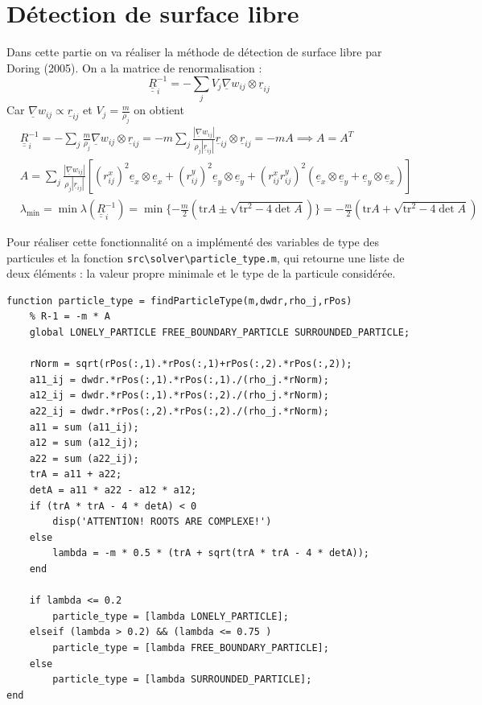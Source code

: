 \documentclass{article}
\newcommand\ul[1]{\underline{#1}}
\newcommand\uul[1]{\underline{\underline{#1}}}
\newcommand\uex{\ul{e}_x}
\newcommand\uey{\ul{e}_y}
\begin{document}
\section{Détection de surface libre}

Dans cette partie on va réaliser la méthode de détection de surface libre par Doring (2005). On a la matrice de renormalisation :
\begin{equation*}
	\uul{R}_i^{-1} = - \sum_{j} V_j \ul{\nabla} w_{ij} \otimes \ul{r}_{ij}
\end{equation*}
Car $\ul{\nabla}w_{ij} \propto \ul{r}_{ij}$ et $V_j = \frac{m}{\rho_j}$ on obtient
\begin{align*}
	& \uul{R}_i^{-1} = - \sum_{j} \frac{m}{\rho_j} \ul{\nabla} w_{ij} \otimes \ul{r}_{ij} = - m \sum_{j} 
	\frac{| \ul{\nabla} w_{ij} |}{\rho_j |\ul{r}_{ij} |} \ul{r}_{ij} \otimes \ul{r}_{ij} = -m A \implies A = A^T \\
	& A = \sum_j \frac{| \ul{\nabla} w_{ij} |}{\rho_j |\ul{r}_{ij} |} \left[ (r_{ij}^x)^2 \uex \otimes \uex + (r_{ij}^y)^2 \uey \otimes \uey + (r_{ij}^x r_{ij}^y)^2 (\uex \otimes \uey + \uey \otimes \uex) \right] \\ 
	& \lambda_{\min} = \min\lambda(\uul{R}_i^{-1}) = \min\{ -\frac{m}{2} (\mathrm{tr} A \pm \sqrt{\mathrm{tr}^2 - 4 \det A}) \} = -\frac{m}{2} (\mathrm{tr} A + \sqrt{\mathrm{tr}^2 - 4 \det A})
\end{align*}

Pour réaliser cette fonctionnalité on a implémenté des variables de type des particules et la fonction \lstinline$src\solver\particle_type.m$, qui retourne une liste de deux éléments : la valeur propre minimale et le type de la particule considérée.
\begin{lstlisting}           
function particle_type = findParticleType(m,dwdr,rho_j,rPos)
    % R-1 = -m * A 
    global LONELY_PARTICLE FREE_BOUNDARY_PARTICLE SURROUNDED_PARTICLE;

    rNorm = sqrt(rPos(:,1).*rPos(:,1)+rPos(:,2).*rPos(:,2)); 
    a11_ij = dwdr.*rPos(:,1).*rPos(:,1)./(rho_j.*rNorm); 
    a12_ij = dwdr.*rPos(:,1).*rPos(:,2)./(rho_j.*rNorm); 
    a22_ij = dwdr.*rPos(:,2).*rPos(:,2)./(rho_j.*rNorm); 
    a11 = sum (a11_ij);
    a12 = sum (a12_ij);
    a22 = sum (a22_ij);
    trA = a11 + a22;
    detA = a11 * a22 - a12 * a12;
    if (trA * trA - 4 * detA) < 0
        disp('ATTENTION! ROOTS ARE COMPLEXE!')
    else
        lambda = -m * 0.5 * (trA + sqrt(trA * trA - 4 * detA));
    end 

    if lambda <= 0.2 
        particle_type = [lambda LONELY_PARTICLE];
    elseif (lambda > 0.2) && (lambda <= 0.75 ) 
        particle_type = [lambda FREE_BOUNDARY_PARTICLE];
    else 
        particle_type = [lambda SURROUNDED_PARTICLE];
end
\end{lstlisting} 
\end{document}
